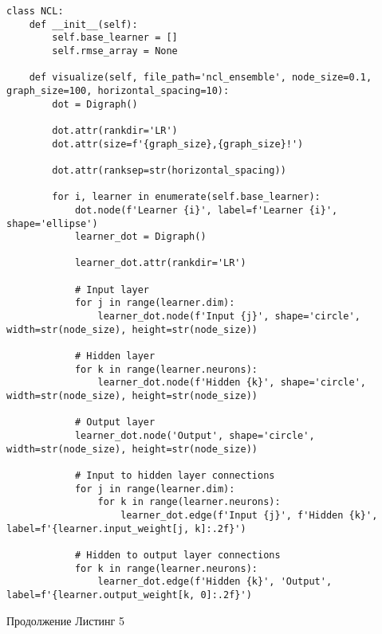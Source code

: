 \documentclass[12pt]{extarticle}
\begin{document}
\begin{lstlisting}
class NCL:
    def __init__(self):
        self.base_learner = []
        self.rmse_array = None

    def visualize(self, file_path='ncl_ensemble', node_size=0.1, graph_size=100, horizontal_spacing=10):
        dot = Digraph()

        dot.attr(rankdir='LR')
        dot.attr(size=f'{graph_size},{graph_size}!')
        
        dot.attr(ranksep=str(horizontal_spacing))

        for i, learner in enumerate(self.base_learner):
            dot.node(f'Learner {i}', label=f'Learner {i}', shape='ellipse')
            learner_dot = Digraph()

            learner_dot.attr(rankdir='LR')

            # Input layer
            for j in range(learner.dim):
                learner_dot.node(f'Input {j}', shape='circle', width=str(node_size), height=str(node_size))

            # Hidden layer
            for k in range(learner.neurons):
                learner_dot.node(f'Hidden {k}', shape='circle', width=str(node_size), height=str(node_size))

            # Output layer
            learner_dot.node('Output', shape='circle', width=str(node_size), height=str(node_size))

            # Input to hidden layer connections
            for j in range(learner.dim):
                for k in range(learner.neurons):
                    learner_dot.edge(f'Input {j}', f'Hidden {k}', label=f'{learner.input_weight[j, k]:.2f}')

            # Hidden to output layer connections
            for k in range(learner.neurons):
                learner_dot.edge(f'Hidden {k}', 'Output', label=f'{learner.output_weight[k, 0]:.2f}')
\end{lstlisting}

\newpage

Продолжение Листинг 5
            
\end{document}

